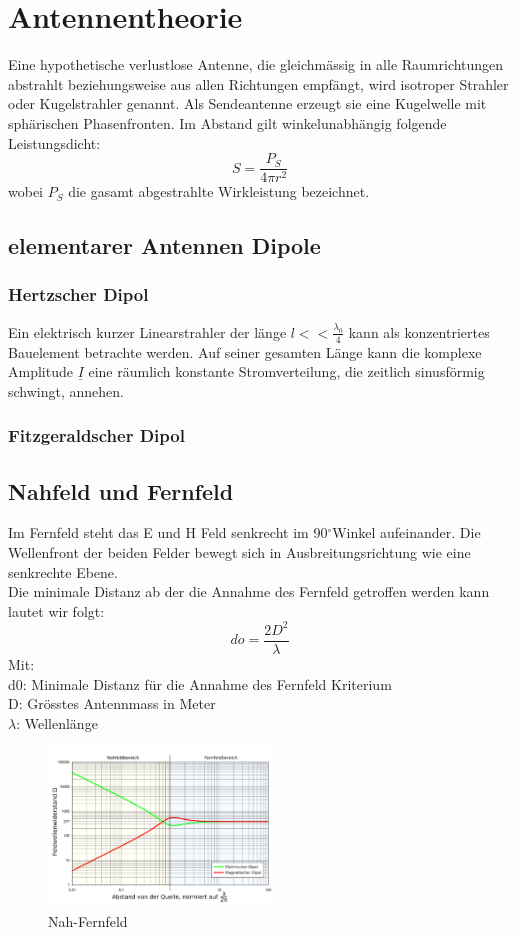 \section{Antennentheorie}
Eine hypothetische verlustlose Antenne, die gleichmässig in alle Raumrichtungen abstrahlt beziehungsweise aus allen Richtungen empfängt, wird isotroper Strahler oder Kugelstrahler genannt. Als Sendeantenne erzeugt sie eine Kugelwelle mit sphärischen Phasenfronten. Im Abstand gilt winkelunabhängig folgende Leistungsdicht:
\[S=\frac{P_{S}}{4 \pi r^{2}}\]
wobei $P_{S}$ die gasamt abgestrahlte Wirkleistung bezeichnet.

\subsection{elementarer Antennen Dipole}
\subsubsection{Hertzscher Dipol}
Ein elektrisch kurzer Linearstrahler der länge $l<<\frac{\lambda_{0}}{4}$ kann als konzentriertes Bauelement betrachte werden. Auf seiner gesamten Länge kann die komplexe Amplitude $\underline{I}$ eine räumlich konstante Stromverteilung, die zeitlich sinusförmig schwingt, annehen.
\subsubsection{Fitzgeraldscher Dipol}
\subsection{Nahfeld und Fernfeld}

Im Fernfeld steht das E und H Feld senkrecht  im 90$^\circ$Winkel aufeinander. Die Wellenfront der beiden Felder bewegt sich in Ausbreitungsrichtung wie eine senkrechte Ebene.\\
Die minimale Distanz ab der die Annahme des Fernfeld getroffen werden kann
 lautet wir folgt:
\[do=\dfrac{2D^2}{\lambda}\]
Mit:\\d0: Minimale Distanz für die Annahme des Fernfeld Kriterium\\
D: Grösstes Antennmass in Meter\\
$\lambda$: Wellenlänge
\begin{figure}[htbp]
	\centering
		\includegraphics[width=6cm]{content/bilder/Feldwellenwiderstandsverlauf_im_Nahfeld-Fernfeld.pdf}
	\caption{Nah-Fernfeld}%
	\label{Nah-Fernfeld}
\end{figure}
